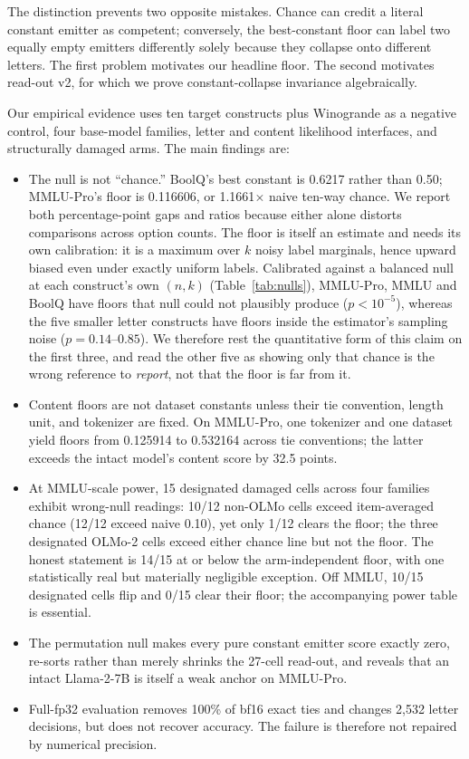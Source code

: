 The distinction prevents two opposite mistakes. Chance can credit a literal constant emitter as competent; conversely, the best-constant floor can label two equally empty emitters differently solely because they collapse onto different letters. The first problem motivates our headline floor. The second motivates read-out v2, for which we prove constant-collapse invariance algebraically.

Our empirical evidence uses ten target constructs plus Winogrande as a negative control, four base-model families, letter and content likelihood interfaces, and structurally damaged arms. The main findings are:

\begin{itemize}[leftmargin=*,nosep]
    \item The null is not ``chance.'' BoolQ's best constant is 0.6217 rather than 0.50; MMLU-Pro's floor is 0.116606, or 1.1661$\times$ naive ten-way chance. We report both percentage-point gaps and ratios because either alone distorts comparisons across option counts. The floor is itself an estimate and needs its own calibration: it is a maximum over $k$ noisy label marginals, hence upward biased even under exactly uniform labels. Calibrated against a balanced null at each construct's own $(n,k)$ (Table~\ref{tab:nulls}), MMLU-Pro, MMLU and BoolQ have floors that null could not plausibly produce ($p<10^{-5}$), whereas the five smaller letter constructs have floors inside the estimator's sampling noise ($p=0.14$--$0.85$). We therefore rest the quantitative form of this claim on the first three, and read the other five as showing only that chance is the wrong reference to \emph{report}, not that the floor is far from it.
    \item Content floors are not dataset constants unless their tie convention, length unit, and tokenizer are fixed. On MMLU-Pro, one tokenizer and one dataset yield floors from 0.125914 to 0.532164 across tie conventions; the latter exceeds the intact model's content score by 32.5 points.
    \item At MMLU-scale power, 15 designated damaged cells across four families exhibit wrong-null readings: 10/12 non-OLMo cells exceed item-averaged chance (12/12 exceed naive 0.10), yet only 1/12 clears the floor; the three designated OLMo-2 cells exceed either chance line but not the floor. The honest statement is 14/15 at or below the arm-independent floor, with one statistically real but materially negligible exception. Off MMLU, 10/15 designated cells flip and 0/15 clear their floor; the accompanying power table is essential.
    \item The permutation null makes every pure constant emitter score exactly zero, re-sorts rather than merely shrinks the 27-cell read-out, and reveals that an intact Llama-2-7B is itself a weak anchor on MMLU-Pro.
    \item Full-fp32 evaluation removes 100\% of bf16 exact ties and changes 2,532 letter decisions, but does not recover accuracy. The failure is therefore not repaired by numerical precision.
\end{itemize}

